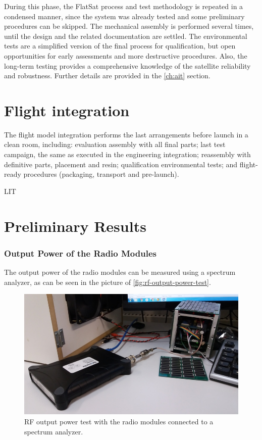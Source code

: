 During this phase, the FlatSat process and test methodology is repeated in a condensed manner, since the system was already tested and some preliminary procedures can be skipped. The mechanical assembly is performed several times, until the design and the related documentation are settled. The environmental tests are a simplified version of the final process for qualification, but open opportunities for early assessments and more destructive procedures. Also, the long-term testing provides a comprehensive knowledge of the satellite reliability and robustness. Further details are provided in the \autoref{ch:ait} section.


\section{Flight integration}

The flight model integration performs the last arrangements before launch in a clean room, including: evaluation assembly with all final parts; last test campaign, the same as executed in the engineering integration; reassembly with definitive parts, placement and resin; qualification environmental tests; and flight-ready procedures (packaging, transport and pre-launch).

LIT

\cite{marcelino2021}


\section{Preliminary Results}


\subsubsection{Output Power of the Radio Modules}

The output power of the radio modules can be measured using a spectrum analyzer, as can be seen in the picture of \autoref{fig:rf-output-power-test}.

\begin{figure}[!ht]
    \begin{center}
        \includegraphics[width=\textwidth]{figures/rf-output-power-test.jpg}
        \caption{RF output power test with the radio modules connected to a spectrum analyzer.}
        \label{fig:rf-output-power-test}
    \end{center}
\end{figure}

